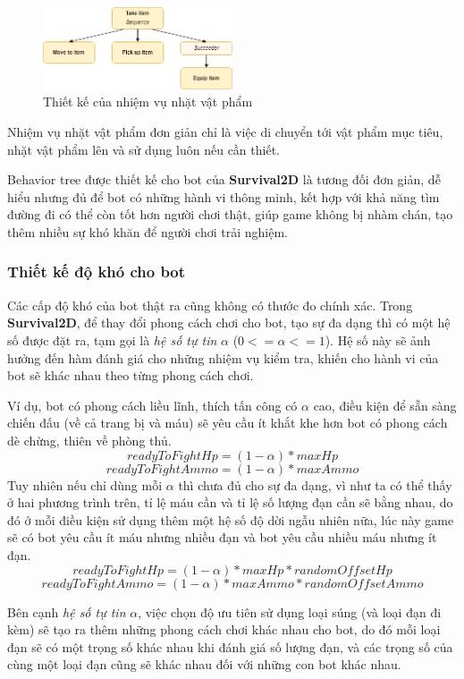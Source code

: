\documentclass[12pt,a4paper]{article}
\begin{document}
  \begin{figure}[H]
      \centering
      \includegraphics[width=0.5\textwidth]{Img/AI/take-item.png}
      \caption{Thiết kế của nhiệm vụ nhặt vật phẩm}
  \end{figure}
  Nhiệm vụ nhặt vật phẩm đơn giản chỉ là việc di chuyển tới vật phẩm mục tiêu, nhặt vật phẩm lên và sử dụng luôn nếu cần thiết.
  \par{}

  Behavior tree được thiết kế cho bot của \textbf{Survival2D} là tương đối đơn giản, dễ hiểu nhưng đủ để bot có những hành vi thông minh, kết hợp với khả năng tìm đường đi có thể còn tốt hơn người chơi thật, giúp game không bị nhàm chán, tạo thêm nhiều sự khó khăn để người chơi trải nghiệm.
  
  \subsubsection{Thiết kế độ khó cho bot}
  Các cấp độ khó của bot thật ra cũng không có thước đo chính xác. Trong \textbf{Survival2D}, để thay đổi phong cách chơi cho bot, tạo sự đa dạng thì có một hệ số được đặt ra, tạm gọi là \textit{hệ số tự tin} \(\alpha\) (\(0 <= \alpha <= 1\)). Hệ số này sẽ ảnh hưởng đến hàm đánh giá cho những nhiệm vụ kiểm tra, khiến cho hành vi của bot sẽ khác nhau theo từng phong cách chơi.

  Ví dụ, bot có phong cách liều lĩnh, thích tấn công có \(\alpha\) cao, điều kiện để sẵn sàng chiến đấu (về cả trang bị và máu) sẽ yêu cầu ít khắt khe hơn bot có phong cách dè chừng, thiên về phòng thủ.
  \[readyToFightHp = (1 - \alpha) * maxHp\]
  \[readyToFightAmmo = (1 - \alpha) * maxAmmo\]
  Tuy nhiên nếu chỉ dùng mỗi \(\alpha\) thì chưa đủ cho sự đa dạng, vì như ta có thể thấy ở hai phương trình trên, tỉ lệ máu cần và tỉ lệ số lượng đạn cần sẽ bằng nhau, do đó ở mỗi điều kiện sử dụng thêm một hệ số độ dời ngẫu nhiên nữa, 
  lúc này game sẽ có bot yêu cầu ít máu nhưng nhiều đạn và bot yêu cầu nhiều máu nhưng ít đạn.
  \[readyToFightHp = (1 - \alpha) * maxHp * randomOffsetHp\]
  \[readyToFightAmmo = (1 - \alpha) * maxAmmo * randomOffsetAmmo\]

  Bên cạnh \textit{hệ số tự tin} \(\alpha\), việc chọn độ ưu tiên sử dụng loại súng (và loại đạn đi kèm) sẽ tạo ra thêm những phong cách chơi khác nhau cho bot, do đó mỗi loại đạn sẽ có một trọng số khác nhau khi đánh giá số lượng đạn, và các trọng số của cùng một loại đạn cũng sẽ khác nhau đối với những con bot khác nhau.
\end{document}
